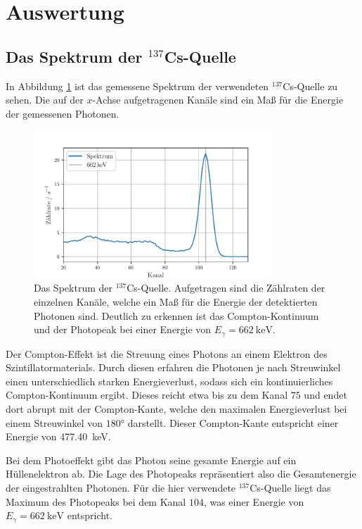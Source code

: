 \newpage
\section{Auswertung}
\label{sec:Auswertung}

\subsection{Das Spektrum der $^{137}$Cs-Quelle}
In Abbildung \ref{fig:tfig1} ist das gemessene Spektrum der verwendeten $^{137}$Cs-Quelle zu sehen.
Die auf der $x$-Achse aufgetragenen Kanäle sind ein Maß für die Energie der gemessenen Photonen.

\begin{figure}
\centering
\includegraphics[width=0.8\textwidth]{figures/Spektrum}
\caption{Das Spektrum der $^{137}$Cs-Quelle. Aufgetragen sind die Zählraten der einzelnen Kanäle, welche ein Maß für die Energie der detektierten Photonen sind.
Deutlich zu erkennen ist das Compton-Kontinuum und der Photopeak bei einer Energie von $E_\gamma = \SI{662}{\keV}$.}
\label{fig:tfig1}
\end{figure}

Der Compton-Effekt ist die Streuung eines Photons an einem Elektron des Szintillatormaterials.
Durch diesen erfahren die Photonen je nach Streuwinkel einen unterschiedlich starken Energieverlust, sodass sich ein kontinuierliches Compton-Kontinuum ergibt.
Dieses reicht etwa bis zu dem Kanal $75$ und endet dort abrupt mit der Compton-Kante, welche den maximalen Energieverlust bei einem Streuwinkel von $180°$ darstellt. Dieser Compton-Kante entspricht einer Energie von \SI{477.40}{\keV}.

Bei dem Photoeffekt gibt das Photon seine gesamte Energie auf ein Hüllenelektron ab.
Die Lage des Photopeaks repräsentiert also die Gesamtenergie der eingestrahlten Photonen.
Für die hier verwendete $^{137}$Cs-Quelle liegt das Maximum des Photopeaks bei dem Kanal $104$, was einer Energie von $E_\gamma = \SI{662}{\keV}$ entspricht.

